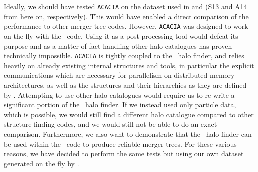 \begin{enumerate}
 
\end{enumerate}

Ideally, we should have tested \texttt{ACACIA} on the dataset used in
\citet{SUSSING_COMPARISON} and \citet{SUSSING_HALOFINDER} (S13 and A14
from here on, respectively).  This would
have enabled a direct comparison of the performance to other merger
tree codes.  However, \texttt{ACACIA} was designed to work on the fly
with the \ramses\ code.  Using it as a post-processing tool would
defeat its purpose and as a matter of fact handling other halo 
catalogues  has proven technically impossible. \texttt{ACACIA} is 
tightly coupled to the \phew\ halo finder, and relies heavily on 
already existing internal structures and tools, in particular the 
explicit communications which are necessary for parallelism on 
distributed memory architectures, as well as the structures and 
their hierarchies as they are defined by \phew. Attempting to use 
other halo catalogues would require us to re-write a significant 
portion of the \phew\ halo finder. If we instead used only particle
data, which is possible, we would still find a different halo catalogue
compared to other structure finding codes, and we would still not be
able to do an exact comparison. Furthermore, we also want to demonstrate that the
\phew\ halo finder can be used within the \ramses\ code to produce
reliable merger trees.  For these various reasons, we have decided to
perform the same tests but using our own dataset generated on the fly by
\ramses.

